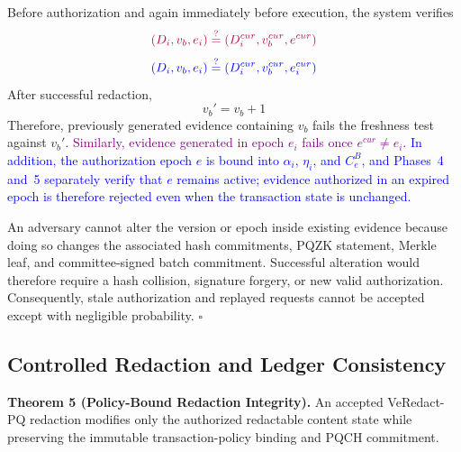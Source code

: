 \documentclass[lettersize,journal]{IEEEtran}
\begin{document}
Before authorization and again immediately before execution, the
system verifies
\begin{equation}
{\color{purple}(D_i,v_b,e_i)
\stackrel{?}{=}
(D_i^{cur},v_b^{cur},e^{cur})}
\end{equation}
\begin{equation}
{\color{blue}(D_i,v_b,e_i)
\stackrel{?}{=}
(D_i^{cur},v_b^{cur},e_i^{cur})}
\label{eq:sec_state_fresh}
\end{equation}
After successful redaction,
\begin{equation}
v_b'=v_b+1
\label{eq:sec_version_update}
\end{equation}
Therefore, previously generated evidence containing $v_b$ fails the
freshness test against $v_b'$. \textcolor{purple}{Similarly, evidence generated in epoch
$e_i$ fails once $e^{cur}\neq e_i$.} \textcolor{blue}{In addition, the
authorization epoch $e$ is bound into $\alpha_i$, $\eta_i$, and $C_e^B$,
and Phases~4 and~5 separately verify that $e$ remains active; evidence
authorized in an expired epoch is therefore rejected even when the
transaction state is unchanged.}

An adversary cannot alter the version or epoch inside existing
evidence because doing so changes the associated hash commitments,
PQZK statement, Merkle leaf, and committee-signed batch commitment.
Successful alteration would therefore require a hash collision,
signature forgery, or new valid authorization. Consequently, stale
authorization and replayed requests cannot be accepted except with
negligible probability.
\hfill$\square$


\subsection{Controlled Redaction and Ledger Consistency}

\textbf{Theorem 5 (Policy-Bound Redaction Integrity).}
An accepted VeRedact-PQ redaction modifies only the authorized
redactable content state while preserving the immutable
transaction-policy binding and PQCH commitment.
\end{document}
